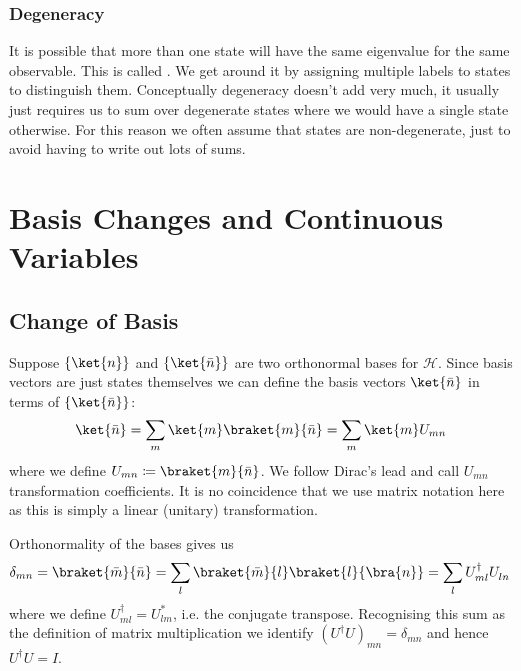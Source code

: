 \documentclass[fleqn]{NotesClass}
\newcommand*{\hilbert}{\mathcal{H}}
\newcommand*{\hermit}{\dagger}
\newcommand{\ident}{I}
\begin{document}
    \subsection{Degeneracy}
    It is possible that more than one state will have the same eigenvalue for the same observable.
    This is called .
    We get around it by assigning multiple labels to states to distinguish them.
    Conceptually degeneracy doesn't add very much, it usually just requires us to sum over degenerate states where we would have a single state otherwise.
    For this reason we often assume that states are non-degenerate, just to avoid having to write out lots of sums.
    
    \chapter{Basis Changes and Continuous Variables}
    \section{Change of Basis}
    Suppose \(\{\ket{n}\}\) and \(\{\ket{\bar{n}}\}\) are two orthonormal bases for \(\hilbert\).
    Since basis vectors are just states themselves we can define the basis vectors \(\ket{\bar{n}}\) in terms of \(\{\ket{\bar{n}}\}\):
    \begin{equation}
        \ket{\bar{n}} = \sum_m \ket{m}\braket{m}{\bar{n}} = \sum_m\ket{m}U_{mn}
    \end{equation}
    where we define \(U_{mn} \coloneqq \braket{m}{\bar{n}}\).
    We follow Dirac's lead and call \(U_{mn}\) transformation coefficients.
    It is no coincidence that we use matrix notation here as this is simply a linear (unitary) transformation.
    
    Orthonormality of the bases gives us
    \begin{equation}
        \delta_{mn} = \braket{\bar{m}}{\bar{n}} = \sum_l \braket{\bar{m}}{l}\braket{l}{\bra{n}} = \sum_l \tensor*{U}{_{ml}^\hermit} \tensor{U}{_{ln}}
    \end{equation}
    where we define \(U_{ml}^\hermit = U_{lm}^*\), i.e. the conjugate transpose.
    Recognising this sum as the definition of matrix multiplication we identify \((U^\hermit U)_{mn} = \delta_{mn}\) and hence \(U^\hermit U = \ident\).
    
\end{document}
